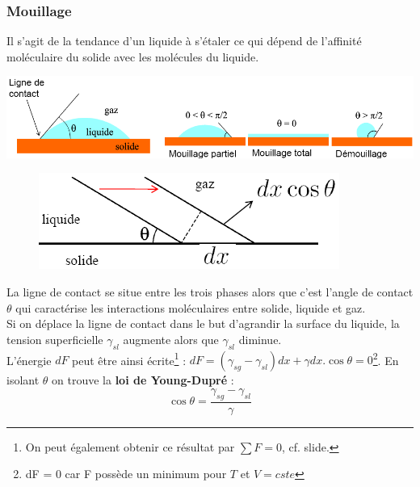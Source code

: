 \documentclass[11pt, a4paper, openany]{book}
\begin{document}
		\subsubsection{Mouillage}
		Il s'agit de la tendance d'un liquide à s'étaler ce qui dépend de l'affinité moléculaire du solide avec les molécules du liquide. 
		\begin{center}
			\includegraphics[scale=0.5]{cp/image14.png}
		\end{center}
		\begin{figure}
			\includegraphics[scale=0.4]{cp/image15.png}
		\end{figure}
		La ligne de contact se situe entre les trois phases alors que c'est l'angle de contact $\theta$ qui caractérise les interactions moléculaires entre solide, liquide et gaz.\\
		
		Si on déplace la ligne de contact dans le but d'agrandir la surface du liquide, la tension superficielle $\gamma_{sl}$ augmente alors que $\gamma_{sl}$ diminue.\\
		L'énergie $dF$ peut être ainsi écrite\footnote{On peut également obtenir ce résultat par $\sum F = 0$, cf. slide.} : $dF = (\gamma_{sg} - \gamma_{sl})dx + \gamma dx.\cos\theta = 0$\footnote{dF = 0 car F possède un minimum pour $T$ et $V = cste$}. En isolant $\theta$ on trouve la \textbf{loi de Young-Dupré} :
		\begin{equation}
			\cos\theta = \frac{\gamma_{sg} - \gamma_{sl}}{\gamma}
		\end{equation}
		
		\newpage
\end{document}

